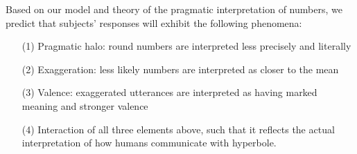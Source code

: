 \documentclass{article} %
\begin{document}
Based on our model and theory of the pragmatic interpretation of numbers, we predict that subjects' responses will exhibit the following phenomena:
\begin{itemize}
\item[(1)] Pragmatic halo: round numbers are interpreted less precisely and literally
\item[(2)] Exaggeration: less likely numbers are interpreted as closer to the mean
\item[(3)] Valence: exaggerated utterances are interpreted as having marked meaning and stronger valence
\item[(4)] Interaction of all three elements above, such that it reflects the actual interpretation of how humans communicate with hyperbole.
\end{itemize}
\end{document}
